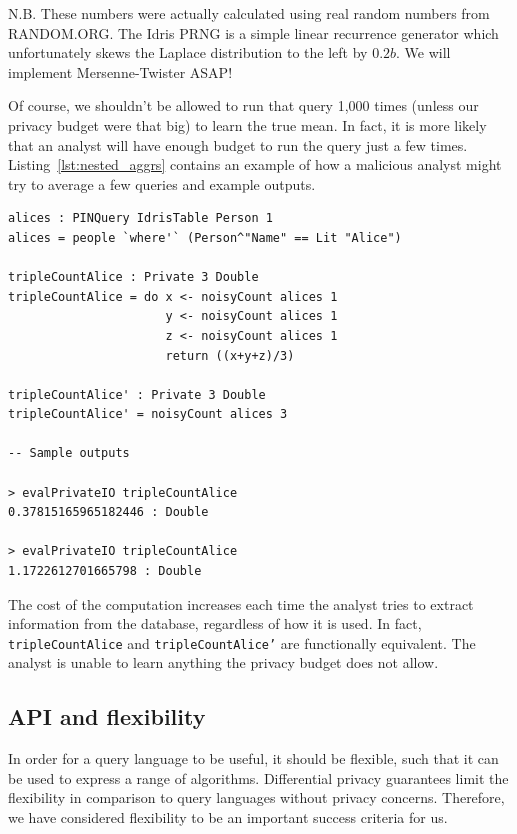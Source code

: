 \documentclass[12pt]{article}
\begin{document}
{\color{red}
  N.B. These numbers were actually calculated using real random numbers from RANDOM.ORG.
  The Idris PRNG is a simple linear recurrence generator which unfortunately skews the Laplace distribution to the left by $0.2b$.
  We will implement Mersenne-Twister ASAP!
}

Of course, we shouldn't be allowed to run that query 1,000 times (unless our privacy budget were that big) to learn the true mean.
In fact, it is more likely that an analyst will have enough budget to run the query just a few times.
Listing~\ref{lst:nested_aggrs} contains an example of how a malicious analyst might try to average a few queries and example outputs.

\begin{lstlisting}[caption={Example of nested aggregations},label={lst:nested_aggrs}]
alices : PINQuery IdrisTable Person 1
alices = people `where'` (Person^"Name" == Lit "Alice")

tripleCountAlice : Private 3 Double
tripleCountAlice = do x <- noisyCount alices 1
                      y <- noisyCount alices 1
                      z <- noisyCount alices 1
                      return ((x+y+z)/3)

tripleCountAlice' : Private 3 Double
tripleCountAlice' = noisyCount alices 3

-- Sample outputs

> evalPrivateIO tripleCountAlice
0.37815165965182446 : Double

> evalPrivateIO tripleCountAlice
1.1722612701665798 : Double
\end{lstlisting}

The cost of the computation increases each time the analyst tries to extract information from the database, regardless of how it is used.
In fact, \texttt{tripleCountAlice} and \texttt{tripleCountAlice'} are functionally equivalent.
The analyst is unable to learn anything the privacy budget does not allow.

\subsection{API and flexibility}

In order for a query language to be useful, it should be flexible, such that it can be used to express a range of algorithms.
Differential privacy guarantees limit the flexibility in comparison to query languages without privacy concerns.
Therefore, we have considered flexibility to be an important success criteria for us.
\end{document}
